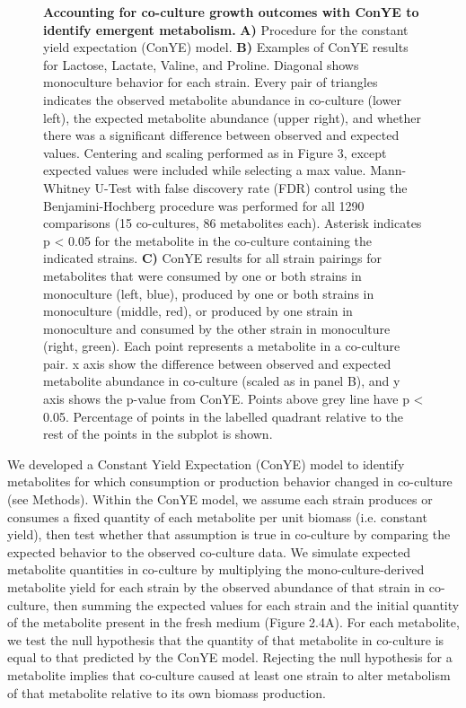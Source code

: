 \documentclass[11pt,twocolumn,notitlepage,openany,twoside]{book}
\begin{document}
\begin{refsection}
\begin{figure}[tb!]
\caption[Accounting for co-culture growth outcomes with ConYE to identify emergent metabolism.]{\textbf{Accounting for co-culture growth outcomes with ConYE to identify emergent metabolism.} \textbf{A)} Procedure for the constant yield expectation (ConYE) model. \textbf{B)} Examples of ConYE results for Lactose, Lactate, Valine, and Proline. Diagonal shows monoculture behavior for each strain. Every pair of triangles indicates the observed metabolite abundance in co-culture (lower left), the expected metabolite abundance (upper right), and whether there was a significant difference between observed and expected values. Centering and scaling performed as in Figure 3, except expected values were included while selecting a max value. Mann-Whitney U-Test with false discovery rate (FDR) control using the Benjamini-Hochberg procedure was performed for all 1290 comparisons (15 co-cultures, 86 metabolites each). Asterisk indicates p < 0.05 for the metabolite in the co-culture containing the indicated strains. \textbf{C)} ConYE results for all strain pairings for metabolites that were consumed by one or both strains in monoculture (left, blue), produced by one or both strains in monoculture (middle, red), or produced by one strain in monoculture and consumed by the other strain in monoculture (right, green). Each point represents a metabolite in a co-culture pair. x axis show the difference between observed and expected metabolite abundance in co-culture (scaled as in panel B), and y axis shows the p-value from ConYE. Points above grey line have p < 0.05. Percentage of points in the labelled quadrant relative to the rest of the points in the subplot is shown.}
\end{figure}

We developed a Constant Yield Expectation (ConYE) model to identify metabolites for which consumption or production behavior changed in co-culture (see Methods). Within the ConYE model, we assume each strain produces or consumes a fixed quantity of each metabolite per unit biomass (i.e. constant yield), then test whether that assumption is true in co-culture by comparing the expected behavior to the observed co-culture data. We simulate expected metabolite quantities in co-culture by multiplying the mono-culture-derived metabolite yield for each strain by the observed abundance of that strain in co-culture, then summing the expected values for each strain and the initial quantity of the metabolite present in the fresh medium (Figure 2.4A). For each metabolite, we test the null hypothesis that the quantity of that metabolite in co-culture is equal to that predicted by the ConYE model. Rejecting the null hypothesis for a metabolite implies that co-culture caused at least one strain to alter metabolism of that metabolite relative to its own biomass production.


\end{refsection}
\end{document}
